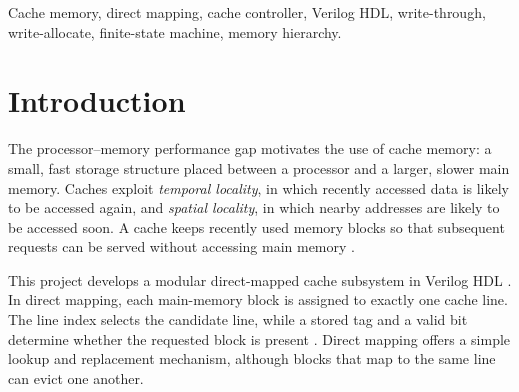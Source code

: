\documentclass[conference,a4paper]{IEEEtran}
\begin{document}
\begin{abstract}\label{sec:abs}
This paper presents the design and Phase~I verification of a 32-bit direct-mapped cache subsystem that reduces average memory-access latency by exploiting temporal and spatial locality. The cache holds 1~KiB as 64 lines of 16-byte blocks (four 32-bit words per line), with a 22-bit tag, 6-bit index and 4-bit offset, and uses write-through and write-allocate policies. The modular Verilog RTL comprises an address decoder, cache storage, an FSM controller, a behavioral main-memory model and a performance monitor. Verification records 374 decoder checks, unit tests for every module, and 39 integrated checks passing with no failures over a 26-access directed sequence (13 hits, 13 misses), supported by eight waveform scenarios. Waveform measurements give completion latencies of 2, 11, 9 and 18 cycles for a read hit, read miss, write hit and write miss. Four read workloads replayed through the RTL give hit rates of 80\% (sequential), 93.75\% (repeated block), 0\% (conflict thrashing) and 35.9\% (seeded random), with measured average memory access times of 3.80, 2.56, 11.00 and 7.77 cycles; a Python model of the same mapping reproduces every hit and miss count. Synthesized for a Lattice ECP5-85F, the cache uses 18{,}851 LUTs, 10{,}978 flip-flops and one block RAM and closes timing at 61.1~MHz after place-and-route.
\end{abstract}

\begin{IEEEkeywords}
Cache memory, direct mapping, cache controller, Verilog HDL, write-through, write-allocate, finite-state machine, memory hierarchy.
\end{IEEEkeywords}

\section{Introduction}\label{sec:intro}
The processor--memory performance gap motivates the use of cache memory: a small, fast storage structure placed between a processor and a larger, slower main memory. Caches exploit \emph{temporal locality}, in which recently accessed data is likely to be accessed again, and \emph{spatial locality}, in which nearby addresses are likely to be accessed soon. A cache keeps recently used memory blocks so that subsequent requests can be served without accessing main memory \cite{patterson,arm}.

This project develops a modular direct-mapped cache subsystem in Verilog HDL \cite{verilog}. In direct mapping, each main-memory block is assigned to exactly one cache line. The line index selects the candidate line, while a stored tag and a valid bit determine whether the requested block is present \cite{patterson,arm}. Direct mapping offers a simple lookup and replacement mechanism, although blocks that map to the same line can evict one another.
\end{document}
